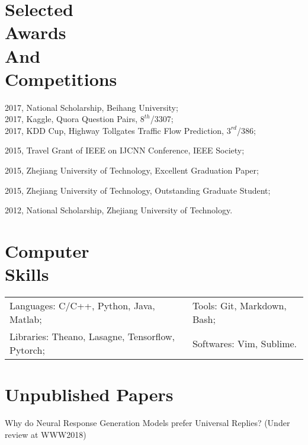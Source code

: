 \documentclass[margin,line]{resume}
\begin{document}
\begin{resume}
\section{Selected \\ Awards \\And\\Competitions}


2017, National Scholarship, Beihang University;\\
2017, Kaggle, Quora Question Pairs, $8^{th}$/3307; \\
2017, KDD Cup, Highway Tollgates Traffic Flow Prediction, $3^{rd}$/386;

2015, Travel Grant of IEEE on IJCNN Conference, IEEE Society;

2015, Zhejiang University of Technology, Excellent Graduation Paper;

2015, Zhejiang University of Technology, Outstanding Graduate Student;


2012, National Scholarship, Zhejiang University of Technology.




\section{Computer \\ Skills}
\begin{tabular}{@{}p{3.8in}p{4in}}
Languages: C/C++, Python, Java, Matlab;& Tools: Git, Markdown, Bash; \\
Libraries: Theano, Lasagne, Tensorflow, Pytorch;  & Softwares: Vim, Sublime. \\
\end{tabular}


\section{Unpublished Papers}
Why do Neural Response Generation Models prefer Universal Replies? (Under review at WWW2018)\\

\end{resume}
\end{document}
